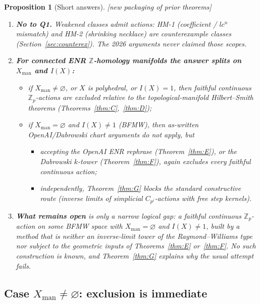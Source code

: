 \documentclass[11pt]{article}
\newtheorem{proposition}[theorem]{Proposition}
\theoremstyle{definition}
\newcommand{\status}[1]{\textit{\textcolor{black!70}{[#1]}}}
\begin{document}
\begin{proposition}[Short answers]
\label{prop:short-answers}
\status{new packaging of prior theorems}
\begin{enumerate}[label=(\roman*)]
\item \textbf{No to Q1.}  Weakened classes admit actions: HM-1 (coefficient /
$lc^n$ mismatch) and HM-2 (shrinking necklace) are counterexample classes
(Section~\ref{sec:counterex}).  The 2026 arguments never claimed those scopes.
\item \textbf{For connected ENR $\mathbb{Z}$-homology manifolds the answer
splits on $X_{\mathrm{man}}$ and $I(X)$:}
\begin{itemize}
\item if $X_{\mathrm{man}}\neq\varnothing$, or $X$ is polyhedral, or
$I(X)=1$, then faithful continuous $\mathbb{Z}_p$-actions are excluded
\emph{relative to} the topological-manifold Hilbert--Smith theorems
(Theorems~\ref{thm:C},~\ref{thm:D});
\item if $X_{\mathrm{man}}=\varnothing$ and $I(X)\neq 1$ (BFMW), then
\emph{as-written} OpenAI/Dabrowski chart arguments do not apply, but
\begin{itemize}
\item accepting the OpenAI ENR rephrase (Theorem~\ref{thm:E}), or the
Dabrowski $k$-tower (Theorem~\ref{thm:F}), again excludes every faithful
continuous action;
\item independently, Theorem~\ref{thm:G} blocks the standard
\emph{constructive} route (inverse limits of simplicial $C_{p^i}$-actions
with free step kernels).
\end{itemize}
\end{itemize}
\item \textbf{What remains open} is only a narrow logical gap: a faithful
continuous $\mathbb{Z}_p$-action on some BFMW space with
$X_{\mathrm{man}}=\varnothing$ and $I(X)\neq 1$, built by a method that is
\emph{neither} an inverse-limit tower of the Raymond--Williams type
\emph{nor} subject to the geometric inputs of Theorems~\ref{thm:E}
or~\ref{thm:F}.  No such construction is known, and Theorem~\ref{thm:G}
explains why the usual attempt fails.
\end{enumerate}
\end{proposition}

\subsection{Case $X_{\mathrm{man}}\neq\varnothing$: exclusion is immediate}
\label{sec:settled-nonempty}
\end{document}
